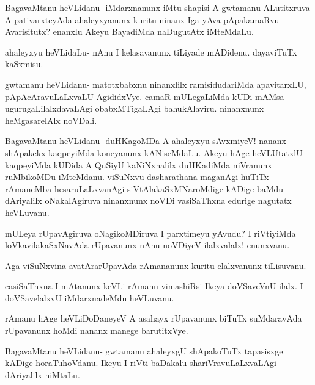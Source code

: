 \documentclass{article}
\begin{document}
\begin{mng}%
BagavaMtanu heVLidanu- iMdarxnanunx iMtu shapisi A gwtamanu
ALutitxruva A pativarxteyAda ahaleyxyanunx kuritu ninanx Iga yAva
pApakamaRvu Avarisitutx? enanxlu Akeyu BayadiMda naDugutAtx iMteMdaLu.
\end{mng}

\begin{mng}%
ahaleyxyu heVLidaLu- nAnu I kelasavanunx tiLiyade mADidenu.
dayaviTuTx kaSxmisu.
\end{mng}

\begin{mng}%
gwtamanu heVLidanu- matotxbabxnu ninanxlilx ramisidudariMda
apavitarxLU, pApAcAravuLaLxvaLU AgididxVye. camaR mULegaLiMda kUDi
mAMsa ugurugaLilalxdavaLAgi obabxMTigaLAgi bahukAlaviru. ninanxnunx heMgasarelAlx
noVDali.
\end{mng}

\begin{mng}%
BagavaMtanu heVLidanu- duHKagoMDa A ahaleyxyu
sAvxmiyeV! nananx shApakekx kaqpeyiMda koneyanunx kANiseMdaLu. Akeyu
hAge heVLUtatxlU kaqpeyiMda kUDida A QuSiyU kaNiNxnalilx duHKadiMda
niVranunx ruMbikoMDu iMteMdanu. viSuNxvu dasharathana maganAgi huTiTx
rAmaneMba hesaruLaLxvanAgi siVtAlakaSxMNaroMdige kADige baMdu dAriyalilx
oNakalAgiruva ninanxnunx noVDi vasiSaThxna edurige nagutatx heVLuvanu.
\end{mng}

\begin{mng}%
mULeya rUpavAgiruva oNagikoMDiruva I parxtimeyu
yAvudu? I riVtiyiMda loVkavilakaSxNavAda rUpavanunx nAnu noVDiyeV
ilalxvalalx! enunxvanu.
\end{mng}

\begin{mng}%
Aga viSuNxvina avatArarUpavAda rAmananunx kuritu elalxvanunx
tiLisuvanu.
\end{mng}

\begin{mng}%
casiSaThxna I mAtanunx keVLi rAmanu vimashiRsi Ikeya doVSaveVnU 
ilalx. I doVSavelalxvU iMdarxnadeMdu heVLuvanu.
\end{mng}

\begin{mng}%
rAmanu hAge heVLiDoDaneyeV A asahayx rUpavanunx biTuTx
suMdaravAda rUpavanunx hoMdi nananx manege barutitxVye.
\end{mng}

\begin{mng}%
BagavaMtanu heVLidanu- gwtamanu ahaleyxgU shApakoTuTx
tapasisxge kADige horaTuhoVdanu. Ikeyu I riVti baDakalu shariVravuLaLxvaLAgi
dAriyalilx niMtaLu.
\end{mng}
\end{document}
